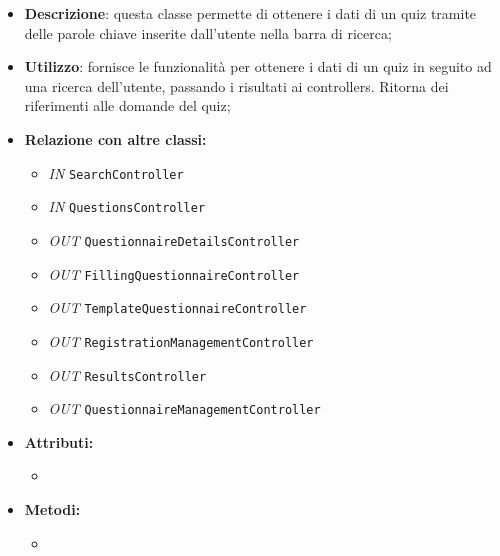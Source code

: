 \begin{itemize}
	\item \textbf{Descrizione}: questa classe permette di ottenere i dati di un quiz tramite delle parole chiave inserite dall'utente nella barra di ricerca;
	\item \textbf{Utilizzo}: fornisce le funzionalità per ottenere i dati di un quiz in seguito ad una ricerca dell'utente, passando i risultati ai controllers. Ritorna dei riferimenti alle domande del quiz;
	\item \textbf{Relazione con altre classi:}
	\begin{itemize}
		\item \textit{IN} \texttt{SearchController} 
		\item \textit{IN} \texttt{QuestionsController}
		\item \textit{OUT} \texttt{QuestionnaireDetailsController} 
		\item \textit{OUT} \texttt{FillingQuestionnaireController} 
		\item \textit{OUT} \texttt{TemplateQuestionnaireController} 
		\item \textit{OUT} \texttt{RegistrationManagementController} 
		\item \textit{OUT} \texttt{ResultsController} 
		\item \textit{OUT} \texttt{QuestionnaireManagementController} 
		
	\end{itemize}
	\item \textbf{Attributi:}
	\begin{itemize}
		\item 
	\end{itemize}
	\item \textbf{Metodi:}
	\begin{itemize}
		\item 
	\end{itemize}
\end{itemize}

